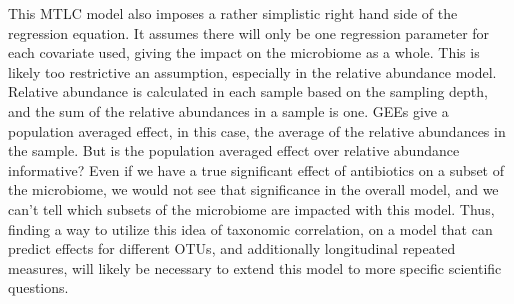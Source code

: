 \documentclass[12pt]{article}
\begin{document}
This MTLC model also imposes a rather simplistic right hand side of the regression equation. It assumes there will only be one regression parameter for each covariate used, giving the impact on the microbiome as a whole. This is likely too restrictive an assumption, especially in the relative abundance model. Relative abundance is calculated in each sample based on the sampling depth, and the sum of the relative abundances in a sample is one. GEEs give a population averaged effect, in this case, the average of the relative abundances in the sample. But is the population averaged effect over relative abundance informative? Even if we have a true significant effect of antibiotics on a subset of the microbiome, we would not see that significance in the overall model, and we can't tell which subsets of the microbiome are impacted with this model. Thus, finding a way to utilize this idea of taxonomic correlation, on a model that can predict effects for different OTUs, and additionally longitudinal repeated measures, will likely be necessary to extend this model to more specific scientific questions.









\begin{singlespace}
\printbibliography
\end{singlespace}
\end{document}
